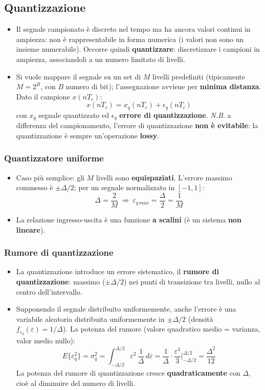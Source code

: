 \documentclass[12pt, a4paper]{article}
\begin{document}
\subsection{Quantizzazione}
\begin{itemize}
    \item Il segnale campionato è discreto nel tempo ma ha ancora valori continui in ampiezza: non è rappresentabile in forma numerica (i valori non sono un insieme numerabile). Occorre quindi \textbf{quantizzare}: discretizzare i campioni in ampiezza, associandoli a un numero limitato di livelli.
    \item Si vuole mappare il segnale su un set di $M$ livelli predefiniti (tipicamente $M=2^B$, con $B$ numero di bit); l'assegnazione avviene per \textbf{minima distanza}. Dato il campione $x(nT_c)$:
    $$x(nT_c) = x_q(nT_c) + \epsilon_q(nT_c)$$
    con $x_q$ segnale quantizzato ed $\epsilon_q$ \textbf{errore di quantizzazione}. \textit{N.B.} a differenza del campionamento, l'errore di quantizzazione \textbf{non è evitabile}: la quantizzazione è sempre un'operazione \textbf{lossy}.
\end{itemize}

\subsubsection{Quantizzatore uniforme}
\begin{itemize}
    \item Caso più semplice: gli $M$ livelli sono \textbf{equispaziati}. L'errore massimo commesso è $\pm\Delta/2$; per un segnale normalizzato in $[-1,1]$:
    $$\Delta = \frac{2}{M} \ \Longrightarrow\ \varepsilon_{q\,max} = \frac{\Delta}{2} = \frac1M$$
    \item La relazione ingresso-uscita è una funzione \textbf{a scalini} (è un sistema \textbf{non lineare}).
\end{itemize}

\subsubsection{Rumore di quantizzazione}
\begin{itemize}
    \item La quantizzazione introduce un errore sistematico, il \textbf{rumore di quantizzazione}: massimo ($\pm\Delta/2$) nei punti di transizione tra livelli, nullo al centro dell'intervallo.
    \item Supponendo il segnale distribuito uniformemente, anche l'errore è una variabile aleatoria distribuita uniformemente in $\pm\Delta/2$ (densità $f_{\varepsilon_q}(\varepsilon)=1/\Delta$). La potenza del rumore (valore quadratico medio = varianza, valor medio nullo):
    $$E\{\varepsilon_q^2\} = \sigma_q^2 = \int_{-\Delta/2}^{\Delta/2} \varepsilon^2\,\frac1\Delta\,d\varepsilon = \frac{1}{\Delta}\cdot\frac{\varepsilon^3}{3}\bigg|_{-\Delta/2}^{\Delta/2} = \frac{\Delta^2}{12}$$
    La potenza del rumore di quantizzazione cresce \textbf{quadraticamente} con $\Delta$, cioè al diminuire del numero di livelli.
\end{itemize}
\end{document}
